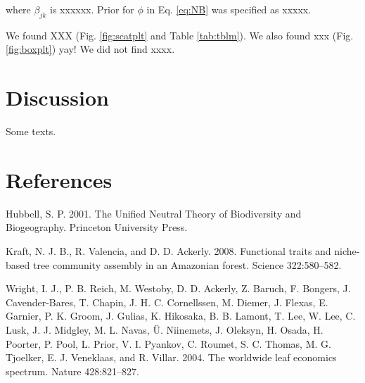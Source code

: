 \documentclass[12pt,]{article}
\begin{document}
where \(\beta_{jk}\) is xxxxxx. Prior for \(\phi\) in Eq. \eqref{eq:NB} was specified as xxxxx.

We found XXX (Fig. \ref{fig:scatplt} and Table \ref{tab:tblm}).
We also found xxx (Fig. \ref{fig:boxplt}) yay!
We did not find xxxx.

\hypertarget{discussion}{%
\section{Discussion}\label{discussion}}

Some texts.

\hypertarget{references}{%
\section{References}\label{references}}

\hypertarget{refs}{}
\leavevmode\hypertarget{ref-Hubbell2001}{}%
Hubbell, S. P. 2001. The Unified Neutral Theory of Biodiversity and Biogeography. Princeton University Press.

\leavevmode\hypertarget{ref-Kraft2008}{}%
Kraft, N. J. B., R. Valencia, and D. D. Ackerly. 2008. Functional traits and niche-based tree community assembly in an Amazonian forest. Science 322:580--582.

\leavevmode\hypertarget{ref-Wright2004a}{}%
Wright, I. J., P. B. Reich, M. Westoby, D. D. Ackerly, Z. Baruch, F. Bongers, J. Cavender-Bares, T. Chapin, J. H. C. Cornellssen, M. Diemer, J. Flexas, E. Garnier, P. K. Groom, J. Gulias, K. Hikosaka, B. B. Lamont, T. Lee, W. Lee, C. Lusk, J. J. Midgley, M. L. Navas, Ü. Niinemets, J. Oleksyn, H. Osada, H. Poorter, P. Pool, L. Prior, V. I. Pyankov, C. Roumet, S. C. Thomas, M. G. Tjoelker, E. J. Veneklaas, and R. Villar. 2004. The worldwide leaf economics spectrum. Nature 428:821--827.

\newpage

\hypertarget{section}{%
\section{}\label{section}}
\end{document}
